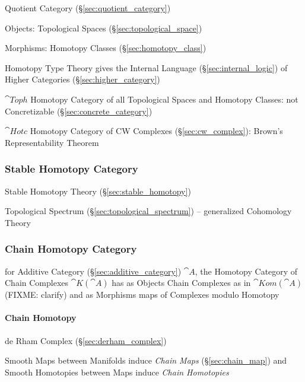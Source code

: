 Quotient Category (\S\ref{sec:quotient_category})

Objects: Topological Spaces (\S\ref{sec:topological_space})

Morphisms: Homotopy Classes (\S\ref{sec:homotopy_class})

Homotopy Type Theory gives the Internal Language
(\S\ref{sec:internal_logic}) of Higher Categories
(\S\ref{sec:higher_category})

$\cat{Toph}$ Homotopy Category of all Topological Spaces and Homotopy
Classes: not Concretizable (\S\ref{sec:concrete_category})

$\cat{Hotc}$ Homotopy Category of CW Complexes
(\S\ref{sec:cw_complex}): Brown's Representability Theorem



\subsubsection{Stable Homotopy Category}\label{sec:stable_homotopy_category}

Stable Homotopy Theory (\S\ref{sec:stable_homotopy})

Topological Spectrum (\S\ref{sec:topological_spectrum}) -- generalized
Cohomology Theory



\subsubsection{Chain Homotopy Category}\label{sec:chain_homotopy_category}

for Additive Category (\S\ref{sec:additive_category}) $\cat{A}$, the Homotopy
Category of Chain Complexes $\cat{K}(\cat{A})$ has as Objects Chain Complexes as
in $\cat{Kom}(\cat{A})$ (FIXME: clarify) and as Morphisms maps of Complexes
modulo Homotopy



\paragraph{Chain Homotopy}\label{sec:chain_homotopy}\hfill

de Rham Complex (\S\ref{sec:derham_complex})

Smooth Maps between Manifolds induce \emph{Chain Maps} (\S\ref{sec:chain_map})
and Smooth Homotopies between Maps induce \emph{Chain Homotopies}



